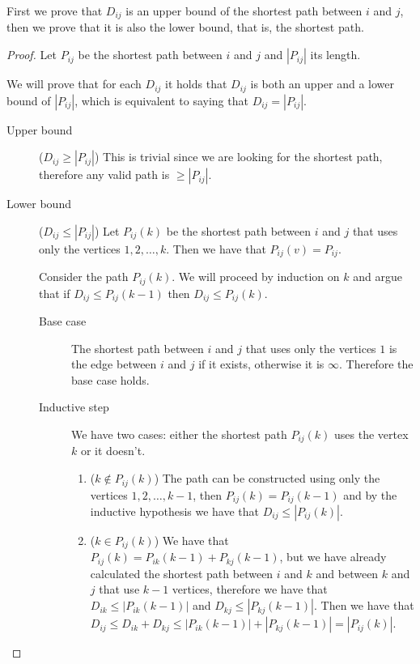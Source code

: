 \documentclass[12pt]{extarticle}
\begin{document}
First we prove that $D_{ij}$ is an upper bound of the shortest path between $i$ and $j$, then we prove that it is also the lower bound, that is, the shortest path.

\begin{proof}
    Let $P_{ij}$ be the shortest path between $i$ and $j$ and $|P_{ij}|$ its length.

    We will prove that for each $D_{ij}$ it holds that $D_{ij}$ is both an upper and a lower bound of $|P_{ij}|$, which is equivalent to saying that $D_{ij} = |P_{ij}|$.
    \begin{description}
        \item[Upper bound] ($D_{ij} \geq |P_{ij}|$)
              This is trivial since we are looking for the shortest path, therefore any valid path is $\geq |P_{ij}|$.
        \item[Lower bound] ($D_{ij} \leq |P_{ij}|$)
              Let $P_{ij}(k)$ be the shortest path between $i$ and $j$ that uses only the vertices $1, 2, \ldots, k$.
              Then we have that $P_{ij}(v) = P_{ij}$.

              Consider the path $P_{ij}(k)$.
              We will proceed by induction on $k$ and argue that if $D_{ij} \leq P_{ij}(k-1)$ then $D_{ij} \leq P_{ij}(k)$.

              \begin{description}
                  \item[Base case] The shortest path between $i$ and $j$ that uses only the vertices $1$ is the edge between $i$ and $j$ if it exists, otherwise it is $\infty$. Therefore the base case holds.
                  \item[Inductive step]
                        We have two cases: either the shortest path $P_{ij}(k)$ uses the vertex $k$ or it doesn't.

                        \begin{enumerate}[label=\roman*.]
                            \item ($k \notin P_{ij}(k)$)
                                  The path can be constructed using only the vertices $1, 2, \ldots, k-1$, then $P_{ij}(k) = P_{ij}(k-1)$ and by the inductive hypothesis we have that $D_{ij} \leq |P_{ij}(k)|$.

                            \item ($k \in P_{ij}(k)$)
                                  We have that $P_{ij}(k) = P_{ik}(k-1) + P_{kj}(k-1)$, but we have already calculated the shortest path between $i$ and $k$ and between $k$ and $j$ that use $k-1$ vertices, therefore we have that $D_{ik} \leq |P_{ik}(k-1)|$ and $D_{kj} \leq |P_{kj}(k-1)|$.
                                  Then we have that $D_{ij} \leq D_{ik} + D_{kj} \leq |P_{ik}(k-1)| + |P_{kj}(k-1)| = |P_{ij}(k)|$.


\end{enumerate}
\end{description}
\end{description}
\end{proof}
\end{document}
